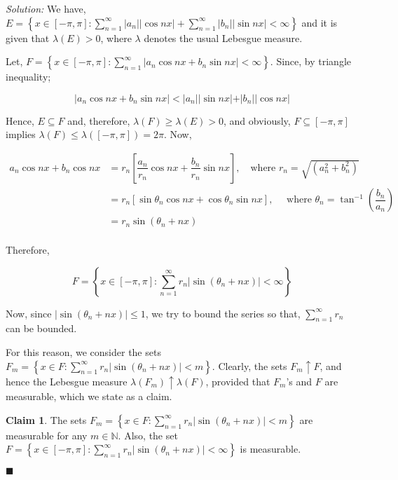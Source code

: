 \documentclass[12pt]{article}
\newcommand{\N}{\mathbb{N}}
\theoremstyle{definition}
\newenvironment{answer}{\textit{Solution: }\quad }{ \hfill $\blacksquare$}
\newtheorem{claim}{Claim}
\begin{document}
\begin{answer}
	We have, $E = \left\{ x\in[-\pi, \pi] : \sum_{n=1}^{\infty} \vert a_n \vert \vert \cos nx \vert + \sum_{n=1}^{\infty} \vert b_n \vert \vert \sin nx \vert < \infty \right\}$ and it is given that $\lambda(E) > 0$, where $\lambda$ denotes the usual Lebesgue measure.

	Let, $F = \left\{ x \in [-\pi, \pi] : \sum_{n=1}^{\infty} \vert a_n \cos nx + b_n \sin nx \vert < \infty \right\}$. Since, by triangle inequality;

	$$\vert a_n \cos nx + b_n \sin nx \vert < \vert a_n \vert \vert \sin nx \vert + \vert b_n \vert \vert \cos nx \vert$$

	Hence, $E \subseteq F$ and, therefore, $\lambda(F) \geq \lambda(E) > 0$, and obviously, $F \subseteq [-\pi, \pi]$ implies $\lambda(F)\leq \lambda([-\pi, \pi]) = 2\pi$. Now, 

	\begin{align*}
		a_n \cos nx + b_n \cos nx
		& = r_n \left[ \dfrac{a_n}{r_n} \cos nx + \dfrac{b_n}{r_n} \sin nx \right], \quad \text{where } r_n = \sqrt{(a_n^2 + b_n^2)}\\
		& = r_n \left[ \sin \theta_n \cos nx + \cos \theta_n \sin nx \right], \quad \text{ where } \theta_n = \tan^{-1}\left(\dfrac{b_n}{a_n} \right)\\
		& = r_n \sin (\theta_n + nx)\\
	\end{align*}

	Therefore, 

	$$F = \left\{ x \in [-\pi, \pi] : \sum_{n=1}^{\infty} r_n \vert \sin(\theta_n + nx) \vert < \infty \right\}$$

	Now, since $\vert \sin(\theta_n + nx) \vert \leq 1$, we try to bound the series so that, $\sum_{n=1}^{\infty} r_n$ can be bounded.

	For this reason, we consider the sets $F_m = \left\{ x \in F : \sum_{n=1}^{\infty} r_n \vert \sin (\theta_n + nx) \vert < m \right\}$. Clearly, the sets $F_m \uparrow F$, and hence the Lebesgue measure $\lambda(F_m) \uparrow \lambda(F)$, provided that $F_m$'s  and $F$ are measurable, which we state as a claim.

	\begin{claim}
		The sets $F_m = \left\{ x \in F : \sum_{n=1}^{\infty} r_n \vert \sin (\theta_n + nx) \vert < m \right\}$ are measurable for any $m \in \N$. Also, the set $F = \left\{ x \in [-\pi, \pi] : \sum_{n=1}^{\infty} r_n \vert \sin(\theta_n + nx) \vert < \infty \right\}$ is measurable.
		\label{claim:2-1}
	\end{claim}


\end{answer}
\end{document}
